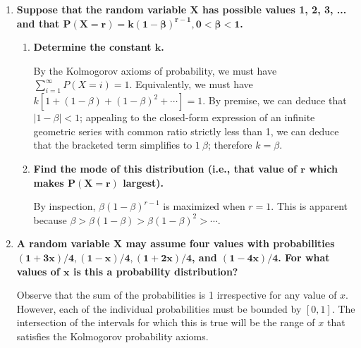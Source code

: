 \documentclass[10pt, oneside]{article}
\begin{document}
\begin{enumerate}[label=4.\arabic*]
\item  \begin{tcolorbox}[
  colback=Cerulean!5!white,
  colframe=Cerulean!75!black]
\textbf{Suppose that the random variable $\bm{X}$ has possible values 1, 2, 3, ... and that $\bm{P(X = r) = k(1 - \beta)^{r - 1}, 0 < \beta < 1}$.}
\end{tcolorbox}

	\begin{enumerate}
	\item  \begin{tcolorbox}[
	  colback=Cerulean!5!white,
	  colframe=Cerulean!75!black]
	\textbf{Determine the constant $\bm{k}$.}
	\end{tcolorbox}
	
	By the Kolmogorov axioms of probability, we must have $\sum^\infty_{i=1} P(X = i) = 1$. Equivalently, we must have $k [ 1 + (1 - \beta) + (1 - \beta)^2 + \cdots] = 1$. By premise, we can deduce that $|1 - \beta| < 1$; appealing to the closed-form expression of an infinite geometric series with common ratio strictly less than 1, we can deduce that the bracketed term simplifies to $1 \ \beta$; therefore $\boxed{k = \beta}$.
	
	\item  \begin{tcolorbox}[
	  colback=Cerulean!5!white,
	  colframe=Cerulean!75!black]
	\textbf{Find the mode of this distribution (i.e., that value of $\bm{r}$ which makes $\bm{P(X = r)}$ largest).}
	\end{tcolorbox}
	
	By inspection, $\beta (1 - \beta)^{r-1}$ is maximized when $\boxed{r = 1}$. This is apparent because $\beta > \beta(1 - \beta) > \beta(1 - \beta)^2 > \cdots$. 

	\end{enumerate}
	
\item  \begin{tcolorbox}[
  colback=Cerulean!5!white,
  colframe=Cerulean!75!black]
\textbf{A random variable $\bm{X}$ may assume four values with probabilities $\bm{(1 + 3x) / 4, (1-x)/4, (1+2x)/4}$, and $\bm{(1-4x) / 4}$. For what values of $\bm{x}$ is this a probability distribution?}
\end{tcolorbox}

Observe that the sum of the probabilities is 1 irrespective for any value of $x$. However, each of the individual probabilities must be bounded by $[0,1]$. The intersection of the intervals for which this is true will be the range of $x$ that satisfies the Kolmogorov probability axioms.


\end{enumerate}
\end{document}
